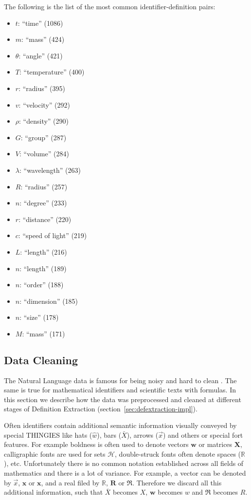The following is the list of the most common identifier-definition pairs:

\begin{itemize}
\item $t$: ``time'' (1086)
\item $m$: ``mass'' (424)
\item $\theta$: ``angle'' (421)
\item $T$: ``temperature'' (400)
\item $r$: ``radius'' (395)
\item $v$: ``velocity'' (292)
\item $\rho$: ``density'' (290)
\item $G$: ``group'' (287)
\item $V$: ``volume'' (284)
\item $\lambda$: ``wavelength'' (263)
\item $R$: ``radius'' (257)
\item $n$: ``degree'' (233)
\item $r$: ``distance'' (220)
\item $c$: ``speed of light'' (219)
\item $L$: ``length'' (216)
\item $n$: ``length'' (189)
\item $n$: ``order'' (188)
\item $n$: ``dimension'' (185)
\item $n$: ``size'' (178)
\item $M$: ``mass'' (171)
\end{itemize}



\subsection{Data Cleaning} \label{sec:datacleaning}

The Natural Language data is famous for being noisy and hard to 
clean \cite{sonntag2004assessing}. The same is true for 
mathematical identifiers and  scientific texts with formulas. 
In this section we describe how the data was preprocessed and 
cleaned at different stages of Definition Extraction 
(section~\ref{sec:defextraction-impl}).


Often identifiers contain additional semantic information visually conveyed 
by special THINGIES like hats ($\hat w$), bars ($\bar X$), arrows ($\overrightarrow x$) 
and others or special fort features. For example boldness is often used to 
denote vectors $\mathbf w$ or matrices $\mathbf X$, calligraphic fonts are 
used for sets $\mathcal H$, double-struck fonts often denote spaces ($\mathbb R$),
etc. Unfortunately there is no common notation established across all fields of 
mathematics and there is a lot of variance. For example, 
a vector can be denoted by $\overrightarrow x$, $\boldsymbol x$ or $\mathbf x$, 
and a real filed by $\mathbb R$, $\mathbf R$ or $\mathfrak R$. 
Therefore we discard all this additional information, such that
$\bar X$ becomes $X$, $\mathbf w$ becomes $w$ and $\mathfrak R$ becomes $R$.



